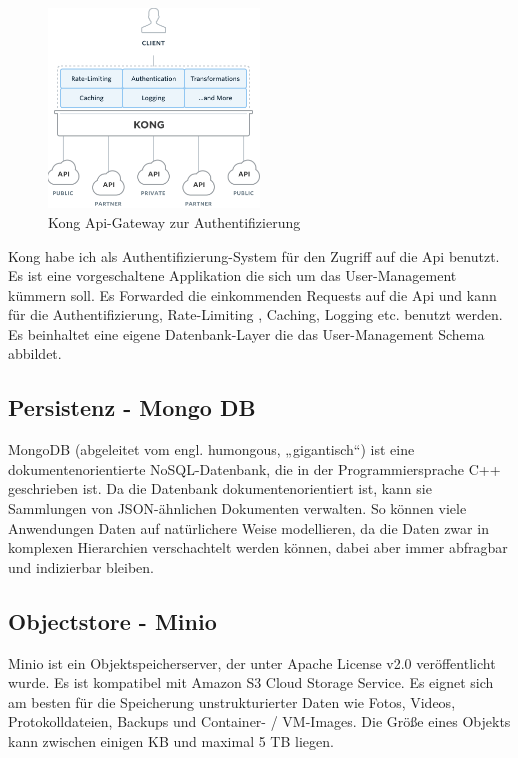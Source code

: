 \documentclass[12pt]{article}
\begin{document}
\begin{figure}[h!]
  \centering
  \includegraphics[width=0.5\textwidth]{images/kong_arch2.png}
  \caption{Kong Api-Gateway zur Authentifizierung}
  \label{}
\end{figure}

Kong habe ich als Authentifizierung-System für den Zugriff auf die Api benutzt. Es ist eine vorgeschaltene Applikation die sich um das User-Management kümmern soll. Es Forwarded die einkommenden Requests auf die Api und kann für die Authentifizierung, Rate-Limiting , Caching, Logging etc. benutzt werden.
Es beinhaltet eine eigene Datenbank-Layer die das User-Management Schema abbildet.




\subsection{Persistenz - Mongo DB \cite{MONGODB}}

MongoDB (abgeleitet vom engl. humongous, „gigantisch“) ist eine dokumentenorientierte NoSQL-Datenbank, die in der Programmiersprache C++ geschrieben ist. Da die Datenbank dokumentenorientiert ist, kann sie Sammlungen von JSON-ähnlichen Dokumenten verwalten. So können viele Anwendungen Daten auf natürlichere Weise modellieren, da die Daten zwar in komplexen Hierarchien verschachtelt werden können, dabei aber immer abfragbar und indizierbar bleiben.

\subsection{Objectstore - Minio \cite{MINIO}}

Minio ist ein Objektspeicherserver, der unter Apache License v2.0 veröffentlicht wurde. Es ist kompatibel mit Amazon S3 Cloud Storage Service. Es eignet sich am besten für die Speicherung unstrukturierter Daten wie Fotos, Videos, Protokolldateien, Backups und Container- / VM-Images. Die Größe eines Objekts kann zwischen einigen KB und maximal 5 TB liegen.
\end{document}
